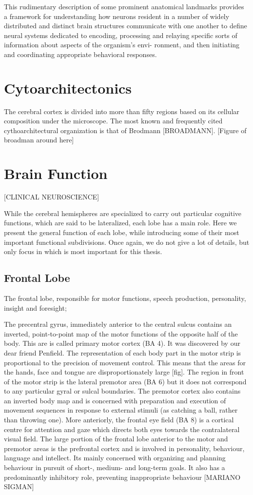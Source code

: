 This rudimentary description of some prominent anatomical landmarks
provides a framework for understanding how neurons resident in a number of widely distributed and distinct brain structures communicate with one another to define neural systems dedicated to encoding, processing and relaying specific sorts of information about aspects of the organism’s envi- ronment, and then initiating and coordinating appropriate behavioral responses.

\section{Cytoarchitectonics}
The cerebral cortex is divided into more than fifty regions based on its cellular composition under the microscope.
The most known and frequently cited cythoarchitectural organization is that of Brodmann [BROADMANN].
[Figure of broadman around here]

\section{Brain Function}
[CLINICAL NEUROSCIENCE]

While the cerebral hemispheres are specialized to carry out particular cognitive functions, which are said to be lateralized, each lobe has a main role.
Here we present the general function of each lobe, while introducing some of their most important functional subdivisions.
Once again, we do not give a lot of details, but only focus in which is most important for this thesis.

\subsection{Frontal Lobe}
The frontal lobe, responsible for motor functions, speech production, personality, insight and foresight;

The precentral gyrus, immediately anterior to the central sulcus contains an inverted, point-to-point map of the motor functions of the opposite half of the body.
This are is called primary motor cortex (BA 4).
It was discovered by our dear friend Penfield.
The representation of each body part in the motor strip is proportional to the precision of movement control. This means that the areas for the hands, face and tongue are disproportionately large [fig].
The region in front of the motor strip is the lateral premotor area (BA 6) but it does not correspond to any particular gyral or sulcal boundaries.
The premotor cortex also contains an inverted body map and is concerned with preparation and execution of movement sequences in response to external stimuli (as catching a ball, rather than throwing one).
More anteriorly, the frontal eye field (BA 8) is a cortical centre for attention and gaze which directs both eyes towards the contralateral visual field.
The large portion of the frontal lobe anterior to the motor and premotor areas is the prefrontal cortex and is involved in personality, behaviour, language and intellect.
Its mainly concerned with organizing and planning behaviour in pursuit of short-, medium- and long-term goals.
It also has a predominantly inhibitory role, preventing inappropriate behaviour [MARIANO SIGMAN]

